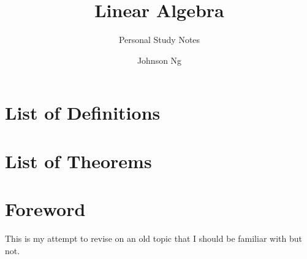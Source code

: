 \documentclass[notoc,notitlepage]{tufte-book}
\title{Linear Algebra}
\author{Johnson Ng}
\subtitle{Personal Study Notes}
\begin{document}
\hypersetup{pageanchor=false}
\maketitle
\hypersetup{pageanchor=true}
\tableofcontents

\chapter*{\faBook \enspace List of Definitions}

\chapter*{\faCoffee \enspace List of Theorems}

\chapter*{Foreword}%
\label{chp:foreword}

\begin{fullwidth}
  This is my attempt to revise on an old topic that I should be familiar with but not.
\end{fullwidth}


\appendix

\backmatter

\pagestyle{plain}

\nobibliography*


\printindex
\end{document}
